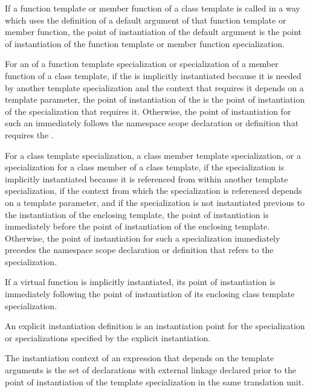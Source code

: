 \pnum
If a function template or member function of a class template is called
in a way which uses the definition of a default argument of that function
template or member function,
the point of instantiation of the default argument is the point of
instantiation of the function template or member function specialization.

\pnum
For an  of a function template
specialization or specialization of a member function of a class template, if
the  is implicitly instantiated because
it is needed by another template specialization and the context that requires
it depends on a template parameter, the point of instantiation of the
 is the point of instantiation of the
specialization that requires it. Otherwise, the point of instantiation for such
an  immediately follows the namespace
scope declaration or definition that requires the
.



\pnum
For a class template specialization, a class member template specialization,
or a specialization for a class member of a class template,
if the specialization is implicitly instantiated because it is referenced
from within another template specialization,
if the context from which the specialization is referenced depends on a
template parameter,
and if the specialization is not instantiated previous to the instantiation of
the enclosing template,
the point of instantiation is immediately before the point of instantiation of
the enclosing template.
Otherwise, the point of instantiation for such a specialization immediately
precedes the namespace scope declaration
or definition that refers to the specialization.

\pnum
If a virtual function is implicitly instantiated, its point of instantiation
is immediately following the point of instantiation of its enclosing class
template specialization.

\pnum
An explicit instantiation definition is an instantiation
point for the specialization or specializations specified by the explicit
instantiation.

\pnum
The instantiation context of an expression that depends on the template
arguments is the set of declarations with external linkage declared prior to the
point of instantiation of the template specialization in the same translation
unit.

